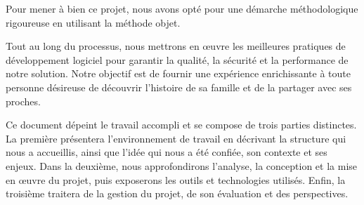 Pour mener à bien ce projet, nous avons opté pour une démarche méthodologique
rigoureuse en utilisant la méthode objet.

Tout au long du processus, nous mettrons en œuvre les meilleures pratiques de
développement logiciel pour garantir la qualité, la sécurité et la performance
de notre solution. Notre objectif est de fournir une expérience enrichissante à toute
personne désireuse de découvrir l’histoire de sa famille et de la
partager avec ses proches.

Ce document dépeint le travail accompli et se compose de trois parties distinctes.
La première présentera l’environnement de travail en décrivant la structure qui
nous a accueillis, ainsi que l’idée qui nous a été confiée, son contexte et ses
enjeux. Dans la deuxième, nous approfondirons l’analyse, la conception et la
mise en œuvre du projet, puis exposerons les outils et technologies utilisés.
Enfin, la troisième traitera de la gestion du projet, de son évaluation et des perspectives.
